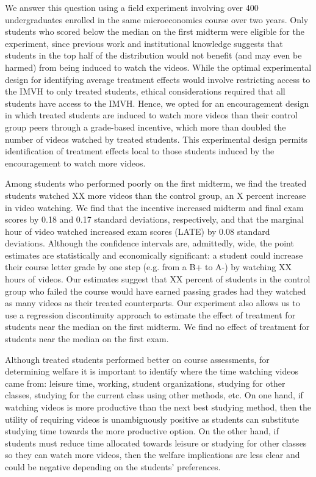 \documentclass[12pt]{article}
\begin{document}
We answer this question using a field experiment involving over 400 undergraduates enrolled in the same microeconomics course over two years. Only students who scored below the median on the first midterm were eligible for the experiment, since previous work and institutional knowledge suggests that students in the top half of the distribution would not benefit (and may even be harmed) from being induced to watch the videos. While the optimal experimental design for identifying average treatment effects would involve restricting access to the IMVH to only treated students, ethical considerations required that all students have access to the IMVH. Hence, we opted for an encouragement design in which treated students are induced to watch more videos than their control group peers through a grade-based incentive, which more than doubled the number of videos watched by treated students. This experimental design permits identification of treatment effects local to those students induced by the encouragement to watch more videos.

Among students who performed poorly on the first midterm, we find the treated students watched XX more videos than the control group, an X percent increase in video watching.  We find that the incentive increased midterm and final exam scores by 0.18 and 0.17 standard deviations, respectively, and that the marginal hour of video watched increased exam scores (LATE) by 0.08 standard deviations. Although the confidence intervals are, admittedly, wide, the point estimates are statistically and economically significant: a student could increase their course letter grade by one step (e.g. from a B+ to A-) by watching XX hours of videos. Our estimates suggest that XX percent of students in the control group who failed the course would have earned passing grades had they watched as many videos as their treated counterparts.%
Our experiment also allows us to use a regression discontinuity approach to estimate the effect of treatment for students near the median on the first midterm. We find no effect of treatment for students near the median on the first exam.  

Although treated students performed better on course assessments, for determining welfare it is important to identify where the time watching videos came from: leisure time, working, student organizations, studying for other classes, studying for the current class using other methods, etc. On one hand, if watching videos is more productive than the next best studying method, then the utility of requiring videos is unambiguously positive as students can substitute studying time towards the more productive option. On the other hand, if students must reduce time allocated towards leisure or studying for other classes so they can watch more videos, then the welfare implications are less clear and could be negative depending on the students' preferences.
\end{document}
